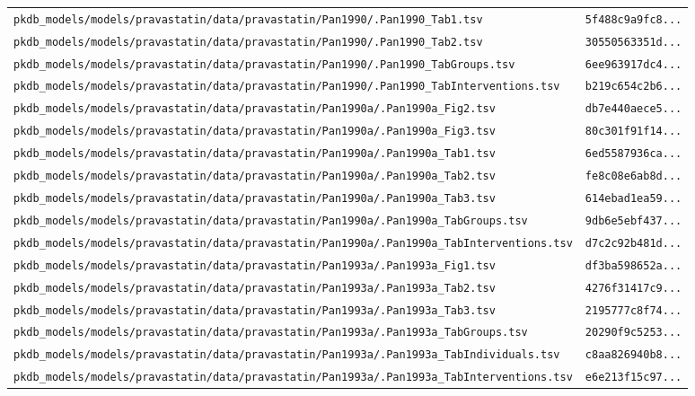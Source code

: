\documentclass{article}
\begin{document}
\begin{longtable}{ll}
\texttt{pkdb\_models/models/pravastatin/data/pravastatin/Pan1990/.Pan1990\_Tab1.tsv} & \texttt{5f488c9a9fc8...} \\
\texttt{pkdb\_models/models/pravastatin/data/pravastatin/Pan1990/.Pan1990\_Tab2.tsv} & \texttt{30550563351d...} \\
\texttt{pkdb\_models/models/pravastatin/data/pravastatin/Pan1990/.Pan1990\_TabGroups.tsv} & \texttt{6ee963917dc4...} \\
\texttt{pkdb\_models/models/pravastatin/data/pravastatin/Pan1990/.Pan1990\_TabInterventions.tsv} & \texttt{b219c654c2b6...} \\
\texttt{pkdb\_models/models/pravastatin/data/pravastatin/Pan1990a/.Pan1990a\_Fig2.tsv} & \texttt{db7e440aece5...} \\
\texttt{pkdb\_models/models/pravastatin/data/pravastatin/Pan1990a/.Pan1990a\_Fig3.tsv} & \texttt{80c301f91f14...} \\
\texttt{pkdb\_models/models/pravastatin/data/pravastatin/Pan1990a/.Pan1990a\_Tab1.tsv} & \texttt{6ed5587936ca...} \\
\texttt{pkdb\_models/models/pravastatin/data/pravastatin/Pan1990a/.Pan1990a\_Tab2.tsv} & \texttt{fe8c08e6ab8d...} \\
\texttt{pkdb\_models/models/pravastatin/data/pravastatin/Pan1990a/.Pan1990a\_Tab3.tsv} & \texttt{614ebad1ea59...} \\
\texttt{pkdb\_models/models/pravastatin/data/pravastatin/Pan1990a/.Pan1990a\_TabGroups.tsv} & \texttt{9db6e5ebf437...} \\
\texttt{pkdb\_models/models/pravastatin/data/pravastatin/Pan1990a/.Pan1990a\_TabInterventions.tsv} & \texttt{d7c2c92b481d...} \\
\texttt{pkdb\_models/models/pravastatin/data/pravastatin/Pan1993a/.Pan1993a\_Fig1.tsv} & \texttt{df3ba598652a...} \\
\texttt{pkdb\_models/models/pravastatin/data/pravastatin/Pan1993a/.Pan1993a\_Tab2.tsv} & \texttt{4276f31417c9...} \\
\texttt{pkdb\_models/models/pravastatin/data/pravastatin/Pan1993a/.Pan1993a\_Tab3.tsv} & \texttt{2195777c8f74...} \\
\texttt{pkdb\_models/models/pravastatin/data/pravastatin/Pan1993a/.Pan1993a\_TabGroups.tsv} & \texttt{20290f9c5253...} \\
\texttt{pkdb\_models/models/pravastatin/data/pravastatin/Pan1993a/.Pan1993a\_TabIndividuals.tsv} & \texttt{c8aa826940b8...} \\
\texttt{pkdb\_models/models/pravastatin/data/pravastatin/Pan1993a/.Pan1993a\_TabInterventions.tsv} & \texttt{e6e213f15c97...} \\

\end{longtable}
\end{document}
